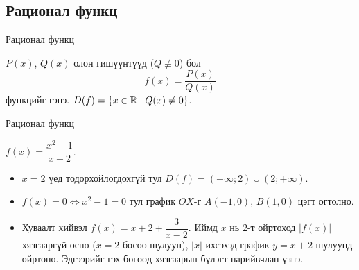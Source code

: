 \subsection{Рационал функц}
\begin{frame}[allowframebreaks]{Рационал функц}
\begin{definition}
$P(x)$, $Q(x)$ олон гишүүнтүүд ($Q\not\equiv0$) бол
\[
f(x)=\frac{P(x)}{Q(x)}
\]
функцийг  гэнэ. $D(f)=\{x\in\mathbb{R}\mid Q(x)\neq0\}$.
\end{definition}
\end{frame}

\begin{frame}[allowframebreaks]{Рационал функц}
\begin{example}
$f(x)=\dfrac{x^2-1}{x-2}$.
\begin{itemize}
  \item $x=2$ үед тодорхойлогдохгүй тул $D(f)=(-\infty;2)\cup(2;+\infty)$.
  \item $f(x)=0 \Leftrightarrow x^2-1=0$ тул график $OX$-г $A(-1,0)$, $B(1,0)$ цэгт огтолно.
  \item Хуваалт хийвэл $f(x)=x+2+\dfrac{3}{x-2}$. Иймд $x$ нь $2$-т ойртоход $|f(x)|$
        хязгааргүй өснө ($x=2$ босоо шулуун), $|x|$ ихсэхэд график $y=x+2$ шулуунд
        ойртоно. Эдгээрийг  гэх бөгөөд хязгаарын бүлэгт нарийвчлан үзнэ.
\end{itemize}
\begin{center}
\begin{fitbox}\end{fitbox}
\end{center}
\end{example}
\end{frame}


